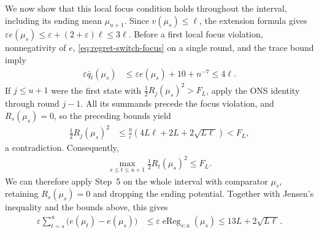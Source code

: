 \documentclass{article}
\newcommand{\1}{\mathbf 1}
\newcommand{\eps}{\varepsilon}
\begin{document}
We now show that this local focus condition holds throughout the
interval, including its ending mean $\mu_{u+1}$.
Since $v(\mu_s)\leq\ell$, the extension formula gives
$\eps e(\mu_s)\leq\eps+(2+\eps)\ell\leq3\ell$.
Before a first local focus violation, nonnegativity of $e$,
\eqref{eq:regret-switch-focus} on a single round, and the trace bound imply
\begin{align}
    \eps \bar{q}_t(\mu_s)
     & \leq\eps e(\mu_s)+10+n^{-7}\leq4\ell.
\end{align}
If $j\leq u+1$ were the first state with
$\tfrac12R_j(\mu_s)^2>F_L$, apply the ONS identity through round $j-1$.
All its summands precede the focus violation, and $R_s(\mu_s)=0$,
so the preceding bounds yield
\begin{align}
    \frac12R_j(\mu_s)^2
     & \leq\frac{\eta}{\eps}
    \left(4L\ell+2L+2\sqrt{L\ell}\right)
    <F_L,
\end{align}
a contradiction. Consequently,
\begin{align}
    \max_{s\leq t\leq u+1}\frac12R_t(\mu_s)^2\leq F_L.
    \label{eq:confinement-local-focus}
\end{align}
We can therefore apply Step~5 on the whole interval with comparator
$\mu_s$, retaining $R_s(\mu_s)=0$ and dropping the ending potential.
Together with Jensen's inequality and the bounds above, this gives
\begin{align}
    \eps\sum_{t=s}^{u}\bigl(e(\mu_t)-e(\mu_s)\bigr)
     & \leq\eps\operatorname{eReg}_{s:u}(\mu_s)
    \leq13L+2\sqrt{L\ell}.
    \label{eq:confinement-local-regret}
\end{align}
\end{document}
